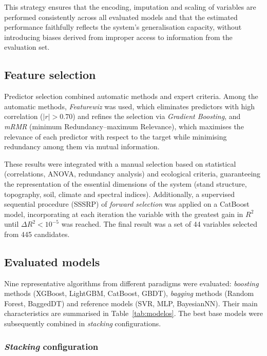 This strategy ensures that the encoding, imputation and scaling of variables are performed consistently across all evaluated models and that the estimated performance faithfully reflects the system's generalisation capacity, without introducing biases derived from improper access to information from the evaluation set.

\subsection{Feature selection}

Predictor selection combined automatic methods and expert criteria. Among the automatic methods, \textit{Featurewiz} was used, which eliminates predictors with high correlation ($|r|>0.70$) and refines the selection via \textit{Gradient Boosting}, and \textit{mRMR} (minimum Redundancy--maximum Relevance), which maximises the relevance of each predictor with respect to the target while minimising redundancy among them via mutual information.

These results were integrated with a manual selection based on statistical (correlations, ANOVA, redundancy analysis) and ecological criteria, guaranteeing the representation of the essential dimensions of the system (stand structure, topography, soil, climate and spectral indices). Additionally, a supervised sequential procedure (SSSRP) of \textit{forward selection} was applied on a CatBoost model, incorporating at each iteration the variable with the greatest gain in $R^2$ until $\Delta R^2 < 10^{-5}$ was reached. The final result was a set of 44 variables selected from 445 candidates.

\subsection{Evaluated models}\label{subsec:modelosevaluados}

Nine representative algorithms from different paradigms were evaluated: \textit{boosting} methods (XGBoost, LightGBM, CatBoost, GBDT), \textit{bagging} methods (Random Forest, BaggedDT) and reference models (SVR, MLP, BayesianNN). Their main characteristics are summarised in Table~\ref{tab:modelos}. The best base models were subsequently combined in \textit{stacking} configurations.

\subsubsection{\textit{Stacking} configuration}

